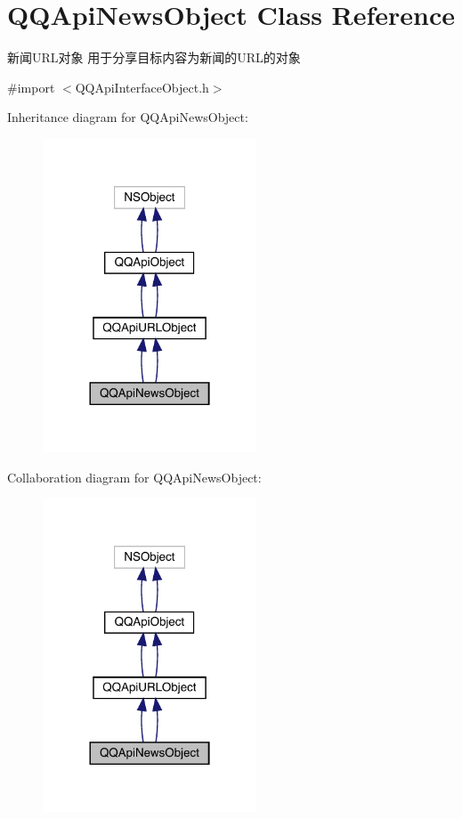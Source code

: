\hypertarget{interface_q_q_api_news_object}{}\section{Q\+Q\+Api\+News\+Object Class Reference}
\label{interface_q_q_api_news_object}


新闻\+U\+R\+L对象 用于分享目标内容为新闻的\+U\+R\+L的对象  




{\ttfamily \#import $<$Q\+Q\+Api\+Interface\+Object.\+h$>$}



Inheritance diagram for Q\+Q\+Api\+News\+Object\+:\nopagebreak
\begin{figure}[H]
\begin{center}
\leavevmode
\includegraphics[width=180pt]{interface_q_q_api_news_object__inherit__graph}
\end{center}
\end{figure}


Collaboration diagram for Q\+Q\+Api\+News\+Object\+:\nopagebreak
\begin{figure}[H]
\begin{center}
\leavevmode
\includegraphics[width=180pt]{interface_q_q_api_news_object__coll__graph}
\end{center}
\end{figure}
